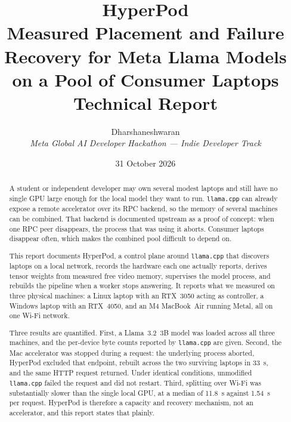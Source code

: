 \documentclass[11pt]{article}
\title{\vspace{-2em}\textbf{HyperPod}\\[0.35em]
\large Measured Placement and Failure Recovery for Meta Llama Models\\
on a Pool of Consumer Laptops\\[0.45em]
\normalsize Technical Report}
\author{\normalsize Dharshaneshwaran\\
\normalsize\textit{Meta Global AI Developer Hackathon --- Indie Developer Track}}
\date{\normalsize 31 October 2026}
\begin{document}
\maketitle
\thispagestyle{fancy}

\begin{abstract}
\noindent
A student or independent developer may own several modest laptops and still have
no single GPU large enough for the local model they want to run. \texttt{llama.cpp}
can already expose a remote accelerator over its RPC backend, so the memory of
several machines can be combined. That backend is documented upstream as a
proof of concept: when one RPC peer disappears, the process that was using it
aborts. Consumer laptops disappear often, which makes the combined pool
difficult to depend on.

This report documents HyperPod, a control plane around \texttt{llama.cpp} that
discovers laptops on a local network, records the hardware each one actually
reports, derives tensor weights from measured free video memory, supervises the
model process, and rebuilds the pipeline when a worker stops answering. It
reports what we measured on three physical machines: a Linux laptop with an
RTX~3050 acting as controller, a Windows laptop with an RTX~4050, and an M4
MacBook~Air running Metal, all on one Wi-Fi network.

Three results are quantified. First, a Llama~3.2~3B model was loaded across all
three machines, and the per-device byte counts reported by \texttt{llama.cpp}
are given. Second, the Mac accelerator was stopped during a request: the
underlying process aborted, HyperPod excluded that endpoint, rebuilt across the
two surviving laptops in \SI{33}{\second}, and the same HTTP request returned.
Under identical conditions, unmodified \texttt{llama.cpp} failed the request and
did not restart. Third, splitting over Wi-Fi was substantially slower than the
single local GPU, at a median of \SI{11.8}{\second} against
\SI{1.54}{\second} per request. HyperPod is therefore a capacity and recovery
mechanism, not an accelerator, and this report states that plainly.
\end{abstract}

\tableofcontents
\clearpage










\end{document}
